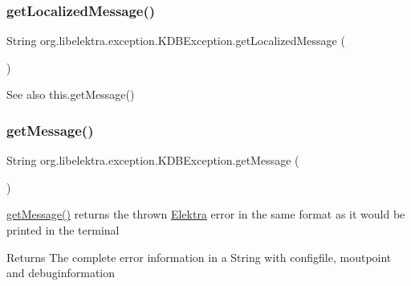\subsubsection{\texorpdfstring{getLocalizedMessage()}{getLocalizedMessage()}}
{\footnotesize\ttfamily String org.\+libelektra.\+exception.\+K\+D\+B\+Exception.\+get\+Localized\+Message (\begin{DoxyParamCaption}{ }\end{DoxyParamCaption})\hspace{0.3cm}{\ttfamily [inline]}}

\begin{DoxySeeAlso}{See also}
this.\+get\+Message() 
\end{DoxySeeAlso}
\mbox{\label{classorg_1_1libelektra_1_1exception_1_1KDBException_a78bbf7b7767f90840ba6bdb22bebfe11}} 
\subsubsection{\texorpdfstring{getMessage()}{getMessage()}}
{\footnotesize\ttfamily String org.\+libelektra.\+exception.\+K\+D\+B\+Exception.\+get\+Message (\begin{DoxyParamCaption}{ }\end{DoxyParamCaption})\hspace{0.3cm}{\ttfamily [inline]}}



\mbox{\hyperlink{classorg_1_1libelektra_1_1exception_1_1KDBException_a78bbf7b7767f90840ba6bdb22bebfe11}{get\+Message()}} returns the thrown \mbox{\hyperlink{interfaceorg_1_1libelektra_1_1Elektra}{Elektra}} error in the same format as it would be printed in the terminal 

\begin{DoxyReturn}{Returns}
The complete error information in a String with configfile, moutpoint and debuginformation 
\end{DoxyReturn}
\mbox{\label{classorg_1_1libelektra_1_1exception_1_1KDBException_a241bb6bc3b93677bc4b51d23b917f9d1}} 
